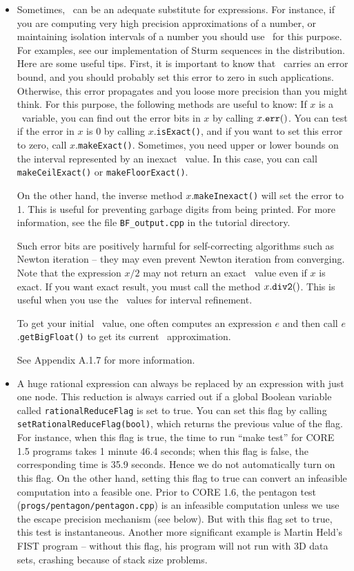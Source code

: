 \documentclass[12pt]{article}
\begin{document}
\begin{itemize}
\item
Sometimes, \BF\ can be an adequate substitute for expressions.  
For instance, if
you are computing very high precision approximations
of a number, or maintaining isolation intervals of a number
you should use \BF\ for this purpose.   For examples,
see our implementation of Sturm sequences in the distribution.
Here are some useful tips.
First, it is important to know that \BF\ carries an error
bound, and you should probably set this error to zero in such
applications.  Otherwise, this error propagates and
you loose more precision than you might think.  For this purpose,
the following methods are useful to know:
If $x$ is a \BF\ variable, you can find out the error bits
in $x$ by calling $x.{\tt err()}$.  You can test if the error
in $x$ is $0$ by calling $x$.{\tt isExact()}, and if you want
to set this error to zero, call $x$.{\tt makeExact()}.
Sometimes, you need upper or lower bounds on the interval
represented by an inexact \BF\ value.  In this case,
you can call \texttt{makeCeilExact()} or \texttt{makeFloorExact()}.

On the other hand, the inverse method
$x$.{\tt makeInexact()} will set the error to 1.
This is useful for preventing garbage digits from being printed.
For more information, see the file \texttt{BF\_output.cpp} in
the tutorial directory.

Such error bits are positively harmful for self-correcting
algorithms such as Newton iteration -- they may even prevent
Newton iteration from converging.
Note that the expression $x/2$ may not return an exact \BF\ value
even if $x$ is exact.  If you want exact result, you must
call the method $x.{\tt div2()}$.  This is useful when you use
the \BF\ values for interval refinement.

To get your initial \BF\ value, one often
computes an expression $e$ and then
call $e$.{\tt getBigFloat()} to get its current \BF\ approximation.

See Appendix A.1.7 for more information.

\item
A huge rational expression can always be replaced
by an expression with just one node.  This reduction is 
always carried out if a global Boolean variable called
\texttt{rationalReduceFlag} is set to true.
You can set this flag 
by calling \texttt{setRationalReduceFlag(bool)},
which returns the previous value of the flag.
For instance, when this flag is true, the time to run ``make test''
for CORE 1.5 programs takes 1 minute 46.4 seconds;
when this flag is false, the corresponding time is 35.9 seconds.
Hence we do not automatically turn on this flag.  On the other hand,
setting this flag to true can convert an infeasible computation
into a feasible one.  Prior to CORE 1.6, the pentagon
test (\texttt{progs/pentagon/pentagon.cpp}) is an infeasible
computation unless we use the escape precision mechanism (see below).
But with this flag set to true, this test is instantaneous.
Another more significant example is Martin Held's FIST program
-- without this flag, his program will not run with 3D data sets,
crashing because of stack size problems.  


\end{itemize}
\end{document}
